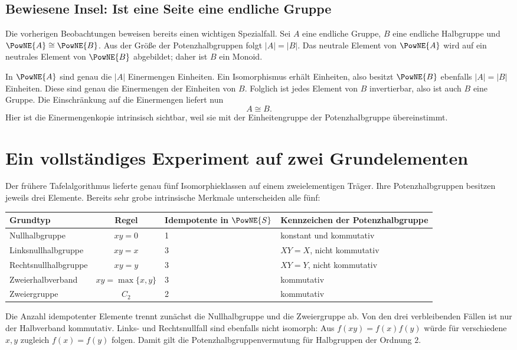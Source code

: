 \documentclass[main.tex]{subfiles}
\begin{document}
\subsection{Bewiesene Insel: Ist eine Seite eine endliche Gruppe}

Die vorherigen Beobachtungen beweisen bereits einen wichtigen Spezialfall.
Sei \(A\) eine endliche Gruppe, \(B\) eine endliche Halbgruppe und
\(\PowNE{A}\cong\PowNE{B}\).  Aus der Größe der Potenzhalbgruppen folgt
\(|A|=|B|\).  Das neutrale Element von \(\PowNE{A}\) wird auf ein neutrales
Element von \(\PowNE{B}\) abgebildet; daher ist \(B\) ein Monoid.

In \(\PowNE{A}\) sind genau die \(|A|\) Einermengen Einheiten.  Ein
Isomorphismus erhält Einheiten, also besitzt \(\PowNE{B}\) ebenfalls
\(|A|=|B|\) Einheiten.  Diese sind genau die Einermengen der Einheiten von
\(B\).  Folglich ist jedes Element von \(B\) invertierbar, also ist auch
\(B\) eine Gruppe.  Die Einschränkung auf die Einermengen liefert nun
\[
  A\cong B.
\]
Hier ist die Einermengenkopie intrinsisch sichtbar, weil sie mit der
Einheitengruppe der Potenzhalbgruppe übereinstimmt.

\section{Ein vollständiges Experiment auf zwei Grundelementen}

Der frühere Tafelalgorithmus lieferte genau fünf Isomorphieklassen auf einem
zweielementigen Träger.  Ihre Potenzhalbgruppen besitzen jeweils drei
Elemente.  Bereits sehr grobe intrinsische Merkmale unterscheiden alle fünf:
\begin{center}
\small
\begin{tabularx}{\textwidth}{@{}lclX@{}}
\toprule
\textbf{Grundtyp}&\textbf{Regel}&
\textbf{Idempotente in \(\PowNE{S}\)}&\textbf{Kennzeichen der Potenzhalbgruppe}\\
\midrule
Nullhalbgruppe&\(xy=0\)&1&konstant und kommutativ\\
Linksnullhalbgruppe&\(xy=x\)&3&\(XY=X\), nicht kommutativ\\
Rechtsnullhalbgruppe&\(xy=y\)&3&\(XY=Y\), nicht kommutativ\\
Zweierhalbverband&\(xy=\max\{x,y\}\)&3&kommutativ\\
Zweiergruppe&\(C_2\)&2&kommutativ\\
\bottomrule
\end{tabularx}
\end{center}
Die Anzahl idempotenter Elemente trennt zunächst die Nullhalbgruppe und die
Zweiergruppe ab.  Von den drei verbleibenden Fällen ist nur der Halbverband
kommutativ.  Links- und Rechtsnullfall sind ebenfalls nicht isomorph: Aus
\(f(xy)=f(x)f(y)\) würde für verschiedene \(x,y\) zugleich
\(f(x)=f(y)\) folgen.  Damit gilt die Potenzhalbgruppenvermutung für
Halbgruppen der Ordnung \(2\).
\end{document}
